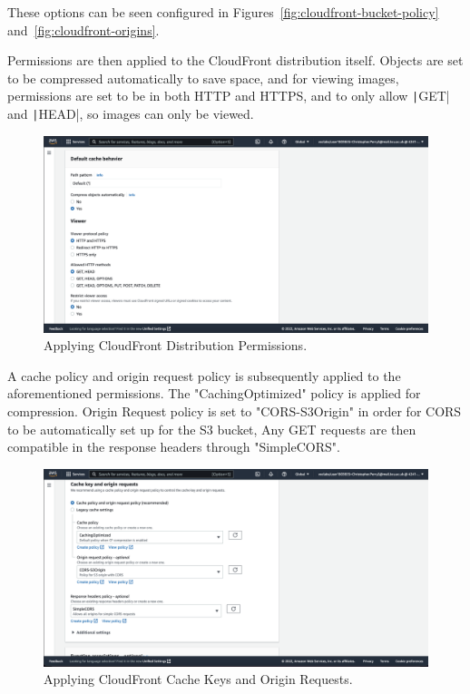 These options can be seen configured in Figures~\ref{fig:cloudfront-bucket-policy} and~\ref{fig:cloudfront-origins}.

\clearpage

Permissions are then applied to the CloudFront distribution itself.
Objects are set to be compressed automatically to save space, and for viewing images, permissions are set to be in
both HTTP and HTTPS, and to only allow \texttt|GET| and \texttt|HEAD|, so images can only be viewed.

\begin{figure}[!htbp]
    \centering
    \includegraphics[width=\textwidth]{resources/cloudfront/cloudfront-cache-behaviour}
    \caption{Applying CloudFront Distribution Permissions.}
    \label{fig:cloudfront-cache-behaviour}
\end{figure}

A cache policy and origin request policy is subsequently applied to the aforementioned permissions.
The "CachingOptimized" policy is applied for compression.
Origin Request policy is set to "CORS-S3Origin" in order for CORS to be automatically set up for the S3 bucket,
Any GET requests are then compatible in the response headers through "SimpleCORS".

\begin{figure}[!htbp]
    \centering
    \includegraphics[width=\textwidth]{resources/cloudfront/cloudfront-cache-key}
    \caption{Applying CloudFront Cache Keys and Origin Requests.}
    \label{fig:cloudfront-cache-key}
\end{figure}

